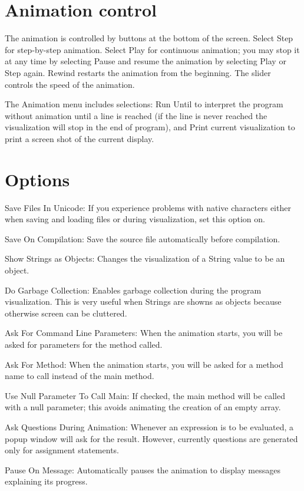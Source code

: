 \documentclass{article}
\begin{document}
\section{Animation control}
The animation is controlled by buttons at the bottom of the screen. Select Step 
for step-by-step animation. Select Play for continuous animation; you may stop 
it at any time by selecting Pause and resume the animation by selecting Play 
or Step again. Rewind restarts the animation from the beginning. The slider controls 
the speed of the animation.

The Animation menu includes selections: Run Until to interpret the program
without animation until a line is reached (if the line is never reached the
visualization will stop in the end of program), and Print current visualization to
print a screen shot of the current display.

\section{Options}

Save Files In Unicode: If you experience problems with native characters
either when saving and loading files or during visualization, set this option on.

Save On Compilation: Save the source file automatically before compilation.

Show Strings as Objects: Changes the visualization of a String value to be an object.

Do Garbage Collection: Enables garbage collection during the program visualization.
This is very useful when Strings are showns as objects because otherwise screen can be cluttered.

Ask For Command Line Parameters: When the animation starts, you will be asked
for parameters for the method called.

Ask For Method: When the animation starts, you will be asked for a method name
to call instead of the main method.

Use Null Parameter To Call Main: If checked, the main method will be called 
with a null parameter; this avoids animating the creation of an empty array.

Ask Questions During Animation: Whenever an expression is to be evaluated, a 
popup window will ask for the result. However, currently questions are generated
only for assignment statements.

Pause On Message: Automatically pauses the animation to display messages
explaining its progress.
\end{document}
